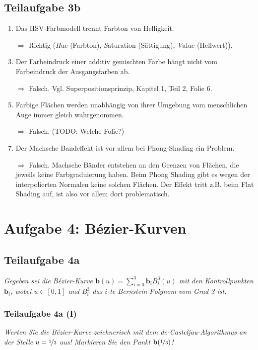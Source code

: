 \documentclass[a4paper]{scrartcl}
\begin{document}
\subsection*{Teilaufgabe 3b}
\begin{enumerate}
    \item Das HSV-Farbmodell trennt Farbton von Helligkeit.
    \item[$\Rightarrow$] Richtig (\textit{H}ue (Farbton), \textit{S}aturation (Sättigung),
                         \textit{V}alue (Hellwert)).
    \item Der Farbeindruck einer additiv gemischten Farbe hängt nicht vom Farbeindruck der Ausgangsfarben ab.
    \item[$\Rightarrow$] Falsch. Vgl. Superpositionsprinzip, Kapitel 1, Teil 2, Folie 6.
    \item Farbige Flächen werden unabhängig von ihrer Umgebung vom menschlichen Auge immer gleich wahrgenommen.
    \item[$\Rightarrow$] Falsch. (TODO: Welche Folie?)
    \item Der Machsche Bandeffekt ist vor allem bei Phong-Shading ein Problem.
    \item[$\Rightarrow$] Falsch. Machsche Bänder entstehen an den Grenzen von Flächen, die jeweils keine Farbgraduierung haben. Beim Phong Shading gibt es wegen der interpolierten Normalen keine solchen Flächen. Der Effekt tritt z.B. beim Flat Shading auf, ist also vor allem dort problematisch. 
\end{enumerate}

\clearpage
\section*{Aufgabe 4: Bézier-Kurven}
\subsection*{Teilaufgabe 4a}
\textit{Gegeben sei die Bézier-Kurve $\mathbf{b}(u) = \sum_{i=0}^3 \mathbf{b}_i B_i^3(u)$ mit den Kontrollpunkten $\mathbf{b}_i$, wobei
$u \in [0, 1]$ und $B_i^3$ das $i$-te Bernstein-Polynom vom Grad 3 ist.}

\subsubsection*{Teilaufgabe 4a (I)}
\textit{Werten Sie die Bézier-Kurve zeichnerisch mit dem de-Casteljau-Algorithmus
an der Stelle $u = \nicefrac{1}{3}$ aus! Markieren Sie den Punkt $\mathbf{b}(\nicefrac{1}{3})$!}
\end{document}
